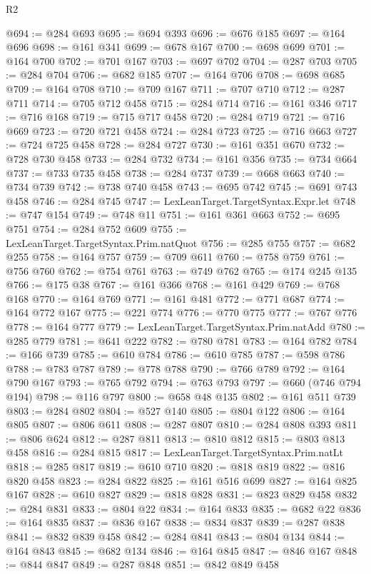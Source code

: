 \begin{lexlean}{R2}
\begin{coremodule}
@694 := @284 @693
@695 := @694 @393
@696 := @676 @185
@697 := @164 @696
@698 := @161 @341
@699 := @678 @167
@700 := @698 @699
@701 := @164 @700
@702 := @701 @167
@703 := @697 @702
@704 := @287 @703
@705 := @284 @704
@706 := @682 @185
@707 := @164 @706
@708 := @698 @685
@709 := @164 @708
@710 := @709 @167
@711 := @707 @710
@712 := @287 @711
@714 := @705 @712 @458
@715 := @284 @714
@716 := @161 @346
@717 := @716 @168
@719 := @715 @717 @458
@720 := @284 @719
@721 := @716 @669
@723 := @720 @721 @458
@724 := @284 @723
@725 := @716 @663
@727 := @724 @725 @458
@728 := @284 @727
@730 := @161 @351 @670
@732 := @728 @730 @458
@733 := @284 @732
@734 := @161 @356
@735 := @734 @664
@737 := @733 @735 @458
@738 := @284 @737
@739 := @668 @663
@740 := @734 @739
@742 := @738 @740 @458
@743 := @695 @742
@745 := @691 @743 @458
@746 := @284 @745
@747 := LexLeanTarget.TargetSyntax.Expr.let
@748 := @747 @154
@749 := @748 @11
@751 := @161 @361 @663
@752 := @695 @751
@754 := @284 @752 @609
@755 := LexLeanTarget.TargetSyntax.Prim.natQuot
@756 := @285 @755
@757 := @682 @255
@758 := @164 @757
@759 := @709 @611
@760 := @758 @759
@761 := @756 @760
@762 := @754 @761
@763 := @749 @762
@765 := @174 @245 @135
@766 := @175 @38
@767 := @161 @366
@768 := @161 @429
@769 := @768 @168
@770 := @164 @769
@771 := @161 @481
@772 := @771 @687
@774 := @164 @772 @167
@775 := @221 @774
@776 := @770 @775
@777 := @767 @776
@778 := @164 @777
@779 := LexLeanTarget.TargetSyntax.Prim.natAdd
@780 := @285 @779
@781 := @641 @222
@782 := @780 @781
@783 := @164 @782
@784 := @166 @739
@785 := @610 @784
@786 := @610 @785
@787 := @598 @786
@788 := @783 @787
@789 := @778 @788
@790 := @766 @789
@792 := @164 @790 @167
@793 := @765 @792
@794 := @763 @793
@797 := @660 (@746 @794 @194)
@798 := @116 @797
@800 := @658 @48 @135
@802 := @161 @511 @739
@803 := @284 @802
@804 := @527 @140
@805 := @804 @122
@806 := @164 @805
@807 := @806 @611
@808 := @287 @807
@810 := @284 @808 @393
@811 := @806 @624
@812 := @287 @811
@813 := @810 @812
@815 := @803 @813 @458
@816 := @284 @815
@817 := LexLeanTarget.TargetSyntax.Prim.natLt
@818 := @285 @817
@819 := @610 @710
@820 := @818 @819
@822 := @816 @820 @458
@823 := @284 @822
@825 := @161 @516 @699
@827 := @164 @825 @167
@828 := @610 @827
@829 := @818 @828
@831 := @823 @829 @458
@832 := @284 @831
@833 := @804 @22
@834 := @164 @833
@835 := @682 @22
@836 := @164 @835
@837 := @836 @167
@838 := @834 @837
@839 := @287 @838
@841 := @832 @839 @458
@842 := @284 @841
@843 := @804 @134
@844 := @164 @843
@845 := @682 @134
@846 := @164 @845
@847 := @846 @167
@848 := @844 @847
@849 := @287 @848
@851 := @842 @849 @458

\end{coremodule}
\end{lexlean}
